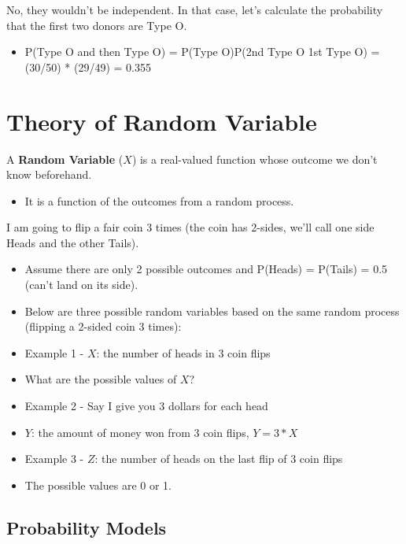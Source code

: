 \documentclass[
]{book}
\providecommand{\tightlist}{%
  \setlength{\itemsep}{0pt}\setlength{\parskip}{0pt}}
\begin{document}
No, they wouldn't be independent. In that case, let's calculate the probability that the first two donors are Type O.

\begin{itemize}
\tightlist
\item
  P(Type O and then Type O) = P(Type O)P(2nd Type O \textbar{} 1st Type O) = (30/50) * (29/49) = 0.355
\end{itemize}

\hypertarget{theory-of-random-variable}{%
\section{Theory of Random Variable}\label{theory-of-random-variable}}

A \textbf{Random Variable} (\(X\)) is a real-valued function whose outcome we don't know beforehand.

\begin{itemize}
\tightlist
\item
  It is a function of the outcomes from a random process.
\end{itemize}

I am going to flip a fair coin 3 times (the coin has 2-sides, we'll call one side Heads and the other Tails).

\begin{itemize}
\item
  Assume there are only 2 possible outcomes and P(Heads) = P(Tails) = 0.5 (can't land on its side).
\item
  Below are three possible random variables based on the same random process (flipping a 2-sided coin 3 times):
\item
  Example 1 - \(X\): the number of heads in 3 coin flips
\item
  What are the possible values of \(X\)?
\item
  Example 2 - Say I give you 3 dollars for each head
\item
  \(Y\): the amount of money won from 3 coin flips, \(Y = 3*X\)
\item
  Example 3 - \(Z\): the number of heads on the last flip of 3 coin flips
\item
  The possible values are 0 or 1.
\end{itemize}

\hypertarget{probability-models}{%
\subsection{Probability Models}\label{probability-models}}
\end{document}
